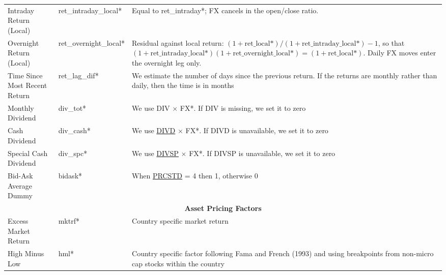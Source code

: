 \documentclass[12pt,title,fleqn]{article}
\begin{document}
{\begin{longtable}{@{\extracolsep{\fill}}|m{5cm}|l|m{8cm}|@{}}
    Intraday Return (Local) & ret\_intraday\_local\mbox{*} & Equal to ret\_intraday\mbox{*}; FX cancels in the open/close ratio. \\

    Overnight Return (Local) & ret\_overnight\_local\mbox{*} & Residual against local return: $(1+\mathrm{ret\_local}\mbox{*})/(1+\mathrm{ret\_intraday\_local}\mbox{*})-1$, so that $(1+\mathrm{ret\_intraday\_local}\mbox{*})(1+\mathrm{ret\_overnight\_local}\mbox{*})=(1+\mathrm{ret\_local}\mbox{*})$. Daily FX moves enter the overnight leg only. \\

    Time Since Most Recent Return  & ret\_lag\_dif\mbox{*} & We estimate the number of days since the previous return. If the returns are monthly rather than daily, then the time is in months\\
 
    
    Monthly Dividend & div\_tot\mbox{*} & We use DIV $\times$ FX\mbox{*}. If DIV is missing, we set it to zero\\
    
    Cash Dividend & div\_cash\mbox{*} & We use 
    \href{https://wrds-www.wharton.upenn.edu/data-dictionary/form_metadata/comp_na_daily_all_secd_dataitems/DIVD/}{DIVD} $\times$ FX\mbox{*}. If DIVD is unavailable, we set it to zero \\
    
    Special Cash Dividend & div\_spc\mbox{*} & We use 
    \href{https://wrds-www.wharton.upenn.edu/data-dictionary/form_metadata/comp_na_daily_all_secd_dataitems/DIVSP/}{DIVSP} $\times$ FX\mbox{*}. If DIVSP is unavailable, we set it to zero \\
    
    Bid-Ask Average Dummy & bidask\mbox{*} & When \href{https://wrds-www.wharton.upenn.edu/data-dictionary/form_metadata/comp_na_daily_all_secd_dataitems/PRCSTD/}{PRCSTD} = 4 then 1, otherwise 0 \\
    
	\hline 
	\multicolumn{3}{|c|}{\textbf{Asset Pricing Factors}} \\
	\hline 
	
	Excess Market Return & mktrf\mbox{*} & Country specific market return \\
		
	High Minus Low & hml\mbox{*} & Country specific factor following Fama and French (1993) and using breakpoints from non-micro cap stocks within the country \\
		

\end{longtable}}
\end{document}
